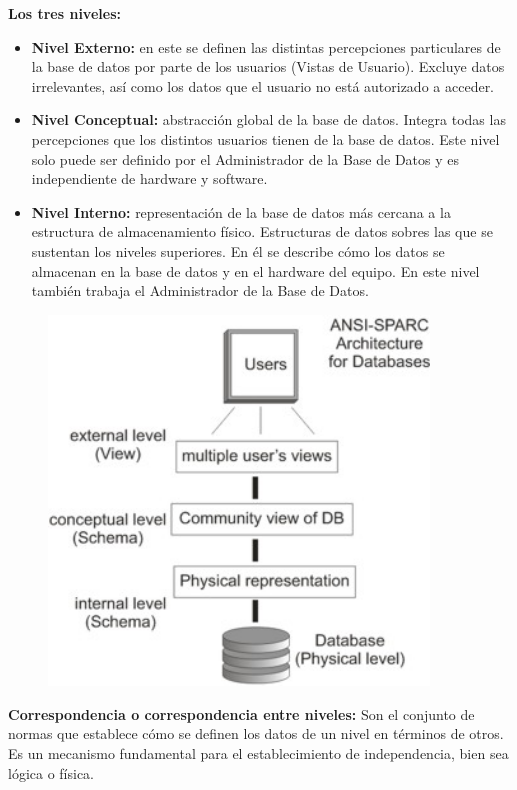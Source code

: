 \documentclass[a4paper,11pt]{article}
\begin{document}
\textbf{Los tres niveles:}
\begin{itemize}
\item \textbf{Nivel Externo:} en este se definen las distintas percepciones particulares de la base de datos por parte de los usuarios (Vistas de Usuario). Excluye datos irrelevantes, así como los datos que el usuario no está autorizado a acceder.

\item \textbf{Nivel Conceptual:} abstracción global de la base de datos. Integra todas las percepciones que los distintos usuarios tienen de la base de datos. Este nivel solo puede ser definido por el Administrador de la Base de Datos y es independiente de hardware y software.

\item \textbf{Nivel Interno:} representación de la base de datos más cercana a la estructura de almacenamiento físico. Estructuras de datos sobres las que se sustentan los niveles superiores. En él se describe cómo los datos se almacenan en la base de datos y en el hardware del equipo. En este nivel también trabaja el Administrador de la Base de Datos.
\end{itemize}

\begin{figure}[h]
\centering
\includegraphics[scale=1, width=0.9\textwidth]{esquema_niveles.jpg}
\end{figure}

\textbf{Correspondencia o correspondencia entre niveles:} Son el conjunto de normas que establece cómo se definen los datos de un nivel en términos de otros. Es un mecanismo fundamental para el establecimiento de independencia, bien sea lógica o física.
\end{document}
